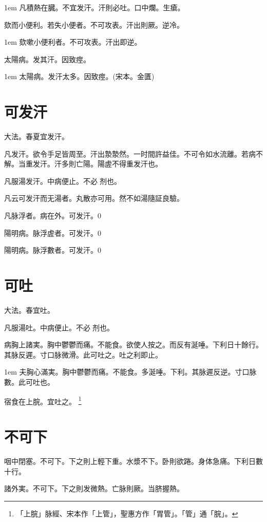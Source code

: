 \hangindent 1em
凡積熱在臓。不宜发汗。汗則必吐。口中爛。生瘡。{\gaoben}

欬而小便利。若失小便者。不可攻表。汗出則厥。逆冷。

\hangindent 1em
欬嗽小便利者。不可攻表。汗出即逆。{\gaoben}

太陽病。发其汗。因致痙。

\hangindent 1em
太陽病。发汗太多。因致痙。(宋本。金匱)

\section{可发汗}

大法。春夏宜发汗。

凡发汗。欲令手足皆周至。汗出漐漐然。一时間許益佳。不可令如水流離。若病不解。当重发汗。汗多則亡陽。陽虗不得重发汗也。

凡服湯发汗。中病便止。不必{\sungtpii 𥁞}剂也。

凡云可发汗而无湯者。丸散亦可用。然不如湯隨証良驗。

凡脉浮者。病在外。可发汗。0

陽明病。脉浮虗者。可发汗。{\yifang}0

陽明病。脉浮數者。可发汗。{\gaoben}0

\section{可吐}

大法。春宜吐。

凡服湯吐。中病便止。不必{\sungtpii 𥁞}剂也。

病胸上諸実。胸中鬱鬱而痛。不能食。欲使人按之。而反有涎唾。下利日十餘行。其脉反遲。寸口{\khaaitp 脉}微滑。此可吐之。吐之利即止。

\hangindent 1em
夫胸心滿実。胸中鬱鬱而痛。不能食。多涎唾。下利。其脉遲反逆。寸口脉數。此可吐也。{\gaoben}

宿食在上脘。宜吐之。
	\footnote{
		「上脘」脉經、宋本作「上管」，聖惠方作「胃管」。「管」通「脘」。
	}

\section{不可下}

咽中閉塞。不可下。下之則上輕下重。水漿不下。卧則欲踡。身体急痛。下利日數十行。

諸外実。不可下。下之則发微熱。亡脉則厥。当脐握熱。


